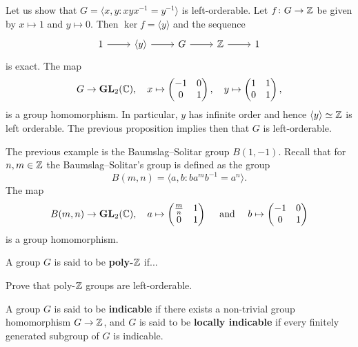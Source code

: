 \begin{example}
	Let us show that $G=\langle x,y:xyx^{-1}=y^{-1}\rangle$ is left-orderable. Let 
	$f\colon G\to\mathbb{Z}$ be given by $x\mapsto 1$ and $y\mapsto 0$. Then $\ker f=\langle y\rangle$ 
	and the sequence 
	\[
	\begin{tikzcd}
	1 & \langle y\rangle & G & \Z & 1
	\arrow[from=1-1, to=1-2]
	\arrow[from=1-2, to=1-3]
	\arrow[from=1-3, to=1-4]
	\arrow[from=1-4, to=1-5]
\end{tikzcd}
\]
is exact. The map
\[
G\to\mathbf{GL}_2(\mathbb{C}),
\quad 
x\mapsto\begin{pmatrix}
-1&0\\
0&1	
\end{pmatrix},
\quad
y\mapsto\begin{pmatrix}
1&1\\
0&1	
\end{pmatrix},
\]
is a group homomorphism. 
In particular, $y$ has infinite order and hence $\langle y\rangle\simeq\mathbb{Z}$ 
is left orderable. The previous proposition implies then that
$G$ is left-orderable. 
\end{example}

The previous example is the Baumslag--Solitar group $B(1,-1)$. Recall that for $n,m\in\mathbb{Z}$
the Baumslag--Solitar's group is defined as the 
group \[
B(m,n)=\langle a,b:ba^mb^{-1}=a^n\rangle.
\]
The map 
\[
B(m,n)\to\mathbf{GL}_2(\mathbb{C}),\quad
a\mapsto\begin{pmatrix}
\frac{m}{n}&1\\
0&1	
\end{pmatrix}\quad\text{ and }\quad  
b\mapsto\begin{pmatrix}
-1&0\\
0&1	
\end{pmatrix}
\] 
is a group homomorphism.

A group $G$ is said to be \textbf{poly-$\mathbb{Z}$} if...

\begin{exercise}
Prove that poly-$\mathbb{Z}$ groups are left-orderable. 	
\end{exercise}

A group $G$ is said to be \textbf{indicable} if there exists a non-trivial 
group homomorphism $G\to\mathbb{Z}$, and $G$ is said to be \textbf{locally indicable} 
if every finitely generated subgroup of $G$ is indicable.  


